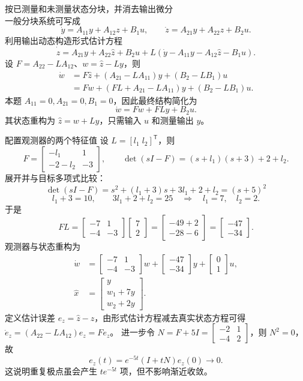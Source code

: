 \documentclass[11pt]{article}
\begin{document}
\begin{solution}
\begin{proofstep}{按已测量和未测量状态分块，并消去输出微分}
\[\]
一般分块系统可写成
\[
 \dot y=A_{11}y+A_{12}z+B_1u,\qquad
 \dot z=A_{21}y+A_{22}z+B_2u.
\]
利用输出动态构造形式估计方程
\[
 \dot{\hat z}=A_{21}y+A_{22}\hat z+B_2u
 +L(\dot y-A_{11}y-A_{12}\hat z-B_1u).
\]
设 $F=A_{22}-LA_{12}$、$w=\hat z-Ly$，则
\[
 \begin{aligned}
 \dot w&=F\hat z+(A_{21}-LA_{11})y+(B_2-LB_1)u\\
 &=Fw+(FL+A_{21}-LA_{11})y+(B_2-LB_1)u.
 \end{aligned}
\]
本题 $A_{11}=0,A_{21}=0,B_1=0$，因此最终结构简化为
\[
 \dot w=Fw+FLy+B_2u.
\]
其状态重构为 $\hat z=w+Ly$，只需输入 $u$ 和测量输出 $y$。
\end{proofstep}
\begin{proofstep}{配置观测器的两个特征值}
设 $L=[l_1\;l_2]^{\mathsf T}$，则
\[
 F=\begin{bmatrix}-l_1&1\\-2-l_2&-3\end{bmatrix},\qquad
 \det(sI-F)=(s+l_1)(s+3)+2+l_2.
\]
展开并与目标多项式比较：
\[
 \det(sI-F)=s^2+(l_1+3)s+3l_1+2+l_2
 =(s+5)^2
\]
\[
 l_1+3=10,\qquad 3l_1+2+l_2=25
 \quad\Longrightarrow\quad l_1=7,\quad l_2=2.
\]
于是
\[
 FL=\begin{bmatrix}-7&1\\-4&-3\end{bmatrix}
 \begin{bmatrix}7\\2\end{bmatrix}
 =\begin{bmatrix}-49+2\\-28-6\end{bmatrix}
 =\begin{bmatrix}-47\\-34\end{bmatrix}.
\]
观测器与状态重构为
\[
 \boxed{\begin{aligned}
  \dot w&=\begin{bmatrix}-7&1\\-4&-3\end{bmatrix}w
   +\begin{bmatrix}-47\\-34\end{bmatrix}y
   +\begin{bmatrix}0\\1\end{bmatrix}u,\\
  \hat x&=\begin{bmatrix}y\\w_1+7y\\w_2+2y\end{bmatrix}.
 \end{aligned}}
\]
定义估计误差 $e_z=\hat z-z$，由形式估计方程减去真实状态方程可得
$\dot e_z=(A_{22}-LA_{12})e_z=Fe_z$。
进一步令 $N=F+5I=\begin{bmatrix}-2&1\\-4&2\end{bmatrix}$，则 $N^2=0$，故
\[
 e_z(t)=e^{-5t}(I+tN)e_z(0)\longrightarrow0.
\]
这说明重复极点虽会产生 $te^{-5t}$ 项，但不影响渐近收敛。
\end{proofstep}


\end{solution}
\end{document}
